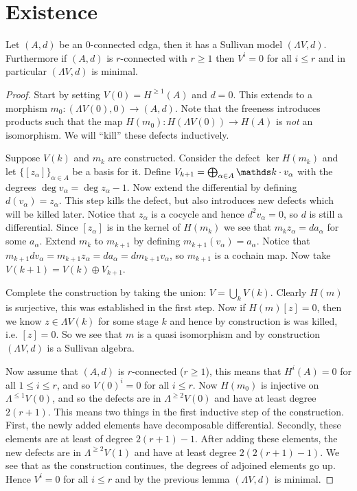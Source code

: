 \section{Existence}

\begin{theorem}
	Let $(A, d)$ be an $0$-connected cdga, then it has a Sullivan model $(\Lambda V, d)$. Furthermore if $(A, d)$ is $r$-connected with $r \geq 1$ then $V^i = 0$ for all $i \leq r$ and in particular $(\Lambda V, d)$ is minimal.
\end{theorem}
\begin{proof}
	Start by setting $V(0) = H^{\geq 1}(A)$ and $d = 0$. This extends to a morphism $m_0 : (\Lambda V(0), 0) \to (A, d)$.
	Note that the freeness introduces products such that the map $H(m_0) : H(\Lambda V(0)) \to H(A)$ is \emph{not} an isomorphism. We will ``kill'' these defects inductively.

	Suppose $V(k)$ and $m_k$ are constructed. Consider the defect $\ker H(m_k)$ and let $\{[z_\alpha]\}_{\alpha \in A}$ be a basis for it. Define $V_{k+1} = \bigoplus_{\alpha \in A} \k \cdot v_\alpha$ with the degrees $\deg{v_\alpha} = \deg{z_\alpha}-1$.
	Now extend the differential by defining $d(v_\alpha) = z_\alpha$. This step kills the defect, but also introduces new defects which will be killed later. Notice that $z_\alpha$ is a cocycle and hence $d^2 v_\alpha = 0$, so $d$ is still a differential.
	Since $[z_\alpha]$ is in the kernel of $H(m_k)$ we see that $m_k z_\alpha = d a_\alpha$ for some $a_\alpha$. Extend $m_k$ to $m_{k+1}$ by defining $m_{k+1}(v_\alpha) = a_\alpha$. Notice that $m_{k+1} d v_\alpha = m_{k+1} z_\alpha = d a_\alpha = d m_{k+1} v_\alpha$, so $m_{k+1}$ is a cochain map.
	Now take $V(k+1) = V(k) \oplus V_{k+1}$.

	Complete the construction by taking the union: $V = \bigcup_k V(k)$. Clearly $H(m)$ is surjective, this was established in the first step. Now if $H(m)[z] = 0$, then we know $z \in \Lambda V(k)$ for some stage $k$ and hence by construction is was killed, i.e. $[z] = 0$. So we see that $m$ is a quasi isomorphism and by construction $(\Lambda V, d)$ is a Sullivan algebra.

	Now assume that $(A, d)$ is $r$-connected ($r \geq 1$), this means that $H^i(A) = 0$ for all $1 \leq i \leq r$, and so $V(0)^i = 0$ for all $i \leq r$. Now $H(m_0)$ is injective on $\Lambda^{\leq 1} V(0)$, and so the defects are in $\Lambda^{\geq 2} V(0)$ and have at least degree $2(r+1)$. This means two things in the first inductive step of the construction. First, the newly added elements have decomposable differential. Secondly, these elements are at least of degree $2(r+1) - 1$. After adding these elements, the new defects are in $\Lambda^{\geq 2} V(1)$ and have at least degree $2(2(r+1) - 1)$. We see that as the construction continues, the degrees of adjoined elements go up. Hence $V^i = 0$ for all $i \leq r$ and by the previous lemma $(\Lambda V, d)$ is minimal.
\end{proof}


